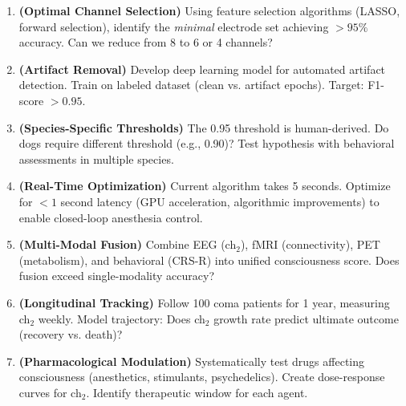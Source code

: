 \begin{enumerate}
\item \textbf{(Optimal Channel Selection)} Using feature selection algorithms (LASSO, forward selection), identify the \textit{minimal} electrode set achieving $> 95\%$ accuracy. Can we reduce from 8 to 6 or 4 channels?

\item \textbf{(Artifact Removal)} Develop deep learning model for automated artifact detection. Train on labeled dataset (clean vs. artifact epochs). Target: F1-score $> 0.95$.

\item \textbf{(Species-Specific Thresholds)} The 0.95 threshold is human-derived. Do dogs require different threshold (e.g., 0.90)? Test hypothesis with behavioral assessments in multiple species.

\item \textbf{(Real-Time Optimization)} Current algorithm takes 5 seconds. Optimize for $< 1$ second latency (GPU acceleration, algorithmic improvements) to enable closed-loop anesthesia control.

\item \textbf{(Multi-Modal Fusion)} Combine EEG (ch$_2$), fMRI (connectivity), PET (metabolism), and behavioral (CRS-R) into unified consciousness score. Does fusion exceed single-modality accuracy?

\item \textbf{(Longitudinal Tracking)} Follow 100 coma patients for 1 year, measuring ch$_2$ weekly. Model trajectory: Does ch$_2$ growth rate predict ultimate outcome (recovery vs. death)?

\item \textbf{(Pharmacological Modulation)} Systematically test drugs affecting consciousness (anesthetics, stimulants, psychedelics). Create dose-response curves for ch$_2$. Identify therapeutic window for each agent.
\end{enumerate}
